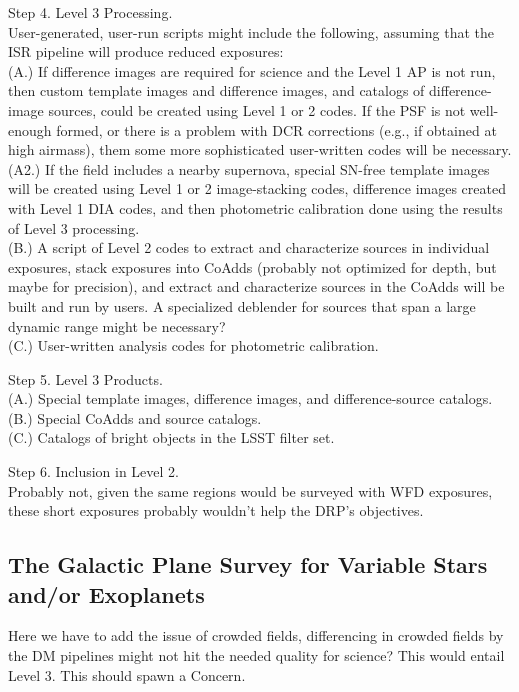 \documentclass[DM,lsstdraft,toc]{lsstdoc}
\begin{document}
Step 4. Level 3 Processing. \\ User-generated, user-run scripts might include the following, assuming that the ISR pipeline will produce reduced exposures: \\
(A.) If difference images are required for science and the Level 1 AP is not run, then custom template images and difference images, and catalogs of difference-image sources, could be created using Level 1 or 2 codes. If the PSF is not well-enough formed, or there is a problem with DCR corrections (e.g., if obtained at high airmass), them some more sophisticated user-written codes will be necessary. \\
(A2.) If the field includes a nearby supernova, special SN-free template images will be created using Level 1 or 2 image-stacking codes, difference images created with Level 1 DIA codes, and then photometric calibration done using the results of Level 3 processing.\\
(B.) A script of Level 2 codes to extract and characterize sources in individual exposures, stack exposures into CoAdds (probably not optimized for depth, but maybe for precision), and extract and characterize sources in the CoAdds will be built and run by users. A specialized deblender for sources that span a large dynamic range might be necessary? \\
(C.) User-written analysis codes for photometric calibration. 

Step 5. Level 3 Products. \\ 
(A.) Special template images, difference images, and difference-source catalogs. \\
(B.) Special CoAdds and source catalogs. \\
(C.) Catalogs of bright objects in the LSST filter set. 

Step 6. Inclusion in Level 2. \\ Probably not, given the same regions would be surveyed with WFD exposures, these short exposures probably wouldn't help the DRP's objectives. 


\subsection{The Galactic Plane Survey for Variable Stars and/or Exoplanets}\label{ssec:SPCS_GPVSEx}

Here we have to add the issue of crowded fields, differencing in crowded fields by the DM pipelines might not hit the needed quality for science? This would entail Level 3. This should spawn a Concern.
\end{document}
